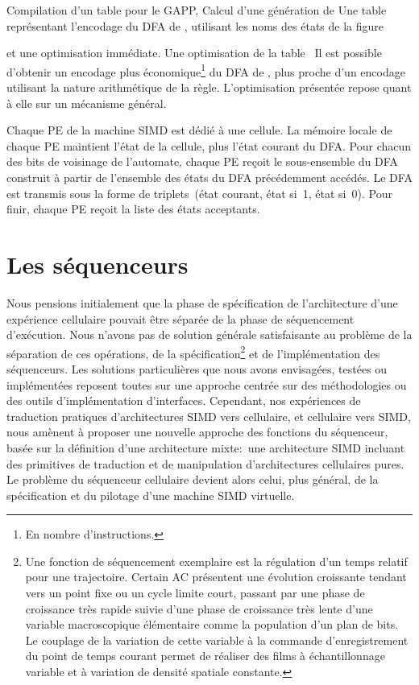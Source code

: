 %
{Compilation d'un table pour le GAPP,}%
{Calcul d'une génération de }%
{Une table représentant l'encodage du DFA de , utilisant
  les noms des états de la figure~}

%
{et une optimisation immédiate.}%
{Une optimisation de la table~}%
{Il est possible d'obtenir un encodage plus économique\footnote{%
    En nombre d'instructions.} %
  du DFA de , plus proche d'un encodage utilisant la
  nature arithmétique de la règle. %
  L'optimisation présentée repose quant à elle sur un mécanisme
  général.}

Chaque PE de la machine SIMD est dédié à une cellule. %
La mémoire locale de chaque PE maintient l'état de la cellule,
plus l'état courant du DFA\@. %
Pour chacun des bits de voisinage de l'automate, chaque PE reçoit le
sous-ensemble du DFA construit à partir de l'ensemble des états du DFA
précédemment accédés. %
Le DFA est transmis sous la forme de triplets~(état courant, état si~1,
état si~0). %
Pour finir, chaque PE reçoit la liste des états acceptants. %

\clearpage

\section{Les séquenceurs}

Nous pensions initialement que la phase de spécification de
l'architecture d'une expérience cellulaire pouvait être séparée de la
phase de séquencement d'exécution. %
Nous n'avons pas de solution générale satisfaisante au problème de
la séparation de ces opérations, de la spécification\footnote{%
  Une fonction de séquencement exemplaire est la régulation d'un temps
  relatif pour une trajectoire. %
  Certain AC présentent une évolution croissante tendant vers un point
  fixe ou un cycle limite court, passant par une phase de croissance
  très rapide suivie d'une phase de croissance très lente d'une
  variable macroscopique élémentaire comme la population d'un  plan de
  bits. %
  Le couplage de la variation de cette variable à la commande
  d'enregistrement du point de temps courant permet de réaliser des
  films à échantillonnage variable et à variation de densité
  spatiale constante.} %
et de l'implémentation des séquenceurs. %
Les solutions particulières que nous avons envisagées, testées ou
implémentées reposent toutes sur une approche 
centrée sur des méthodologies ou des outils d'implémentation
d'interfaces. %
Cependant, nos expériences de traduction pratiques d'architectures
SIMD vers cellulaire, et cellulaire vers SIMD, nous amènent à proposer
une nouvelle approche des fonctions du séquenceur, basée sur la
définition d'une architecture mixte:~une architecture SIMD incluant des
primitives de traduction et de manipulation d'architectures
cellulaires pures. %
Le problème du séquenceur cellulaire devient alors celui, %
plus général, de la spécification et du pilotage d'une machine SIMD
virtuelle.

